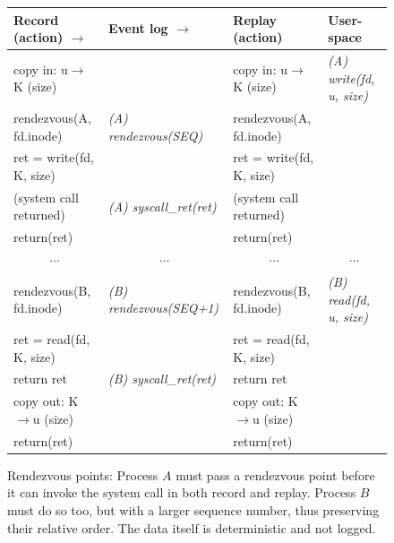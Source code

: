 \begin{figure}[t]
  \small
  \begin{center}
  \begin{tabular}{lll|l}

    \hline	

    {\bf Record (action) \hfill $\rightarrow$ }
      & {\bf Event log \hfill $\rightarrow$ }
        & {\bf Replay (action)}
          & {\bf User-space}
            \\

    \hline	

    copy in: u$\rightarrow$K (size)
      &
        & copy in: u$\rightarrow$K (size)
          & {\em (A) write(fd, u, size)}
            \\

    rendezvous(A, fd.inode)
      & {\em (A) rendezvous(SEQ)}
        & rendezvous(A, fd.inode)
          &
            \\

    ret = write(fd, K, size)
      &
        & ret = write(fd, K, size)
          &
            \\

    (system call returned)
      & {\em (A) syscall\_ret(ret)}
        & (system call returned)
          &
            \\

    return(ret)
      &
        & return(ret)
          &
            \\

    \multicolumn{1}{c}{ $\cdots$}
      & \multicolumn{1}{c}{ $\cdots$}
        & \multicolumn{1}{c}{ $\cdots$}
          & \multicolumn{1}{|c}{ $\cdots$}
            \\

    rendezvous(B, fd.inode)
      & {\em (B) rendezvous(SEQ+1)}
        & rendezvous(B, fd.inode)
          & {\em (B) read(fd, u, size)}
            \\

    ret = read(fd, K, size)
      &
        & ret = read(fd, K, size)
          &
            \\

    return ret
      & {\em (B) syscall\_ret(ret)}
        & return ret
          &
            \\

    copy out: K$\rightarrow$u (size)
      &
        & copy out: K$\rightarrow$u (size)
          &
            \\

    return(ret)
      &
        & return(ret)
          &
            \\

    \hline	

  \end{tabular}
  \end{center}

  \caption{Rendezvous points:
    {
      Process $A$ must pass a rendezvous point before it can invoke
      the system call in both record and replay. Process $B$ must do
      so too, but with a larger sequence number, thus preserving their
      relative order. The data itself is deterministic and not logged.
    }
  }
  \label{scribe:fig:rendezvous}
\end{figure}
